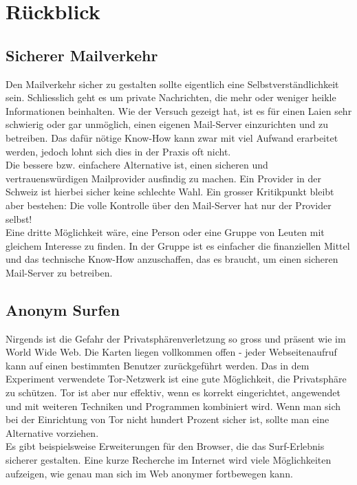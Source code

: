\section{Rückblick}

\subsection{Sicherer Mailverkehr}
Den Mailverkehr sicher zu gestalten sollte eigentlich eine Selbstverständlichkeit sein. Schliesslich geht es um private Nachrichten, die mehr oder weniger heikle Informationen beinhalten.
Wie der Versuch gezeigt hat, ist es für einen Laien sehr schwierig oder gar unmöglich, einen eigenen Mail-Server einzurichten und zu betreiben.
Das dafür nötige Know-How kann zwar mit viel Aufwand erarbeitet werden, jedoch lohnt sich dies in der Praxis oft nicht. 
\\
Die bessere bzw. einfachere Alternative ist, einen sicheren und vertrauenswürdigen Mailprovider ausfindig zu machen. 
Ein Provider in der Schweiz ist hierbei sicher keine schlechte Wahl. 
Ein grosser Kritikpunkt bleibt aber bestehen: Die volle Kontrolle über den Mail-Server hat nur der Provider selbst!
\\
Eine dritte Möglichkeit wäre, eine Person oder eine Gruppe von Leuten mit gleichem Interesse zu finden. In der Gruppe ist es einfacher die finanziellen Mittel und das technische Know-How anzuschaffen, das es braucht, um einen sicheren Mail-Server zu betreiben.

\subsection{Anonym Surfen}
Nirgends ist die Gefahr der Privatsphärenverletzung so gross und präsent wie im World Wide Web. 
Die Karten liegen vollkommen offen - jeder Webseitenaufruf kann auf einen bestimmten Benutzer zurückgeführt werden.
Das in dem Experiment verwendete Tor-Netzwerk ist eine gute Möglichkeit, die Privatsphäre zu schützen.
Tor ist aber nur effektiv, wenn es korrekt eingerichtet, angewendet und mit weiteren Techniken und Programmen kombiniert wird.
Wenn man sich bei der Einrichtung von Tor nicht hundert Prozent sicher ist, sollte man eine Alternative vorziehen.
\\
Es gibt beispielsweise Erweiterungen für den Browser, die das Surf-Erlebnis sicherer gestalten. Eine kurze Recherche im Internet wird viele Möglichkeiten aufzeigen, wie genau man sich im Web anonymer fortbewegen kann.

